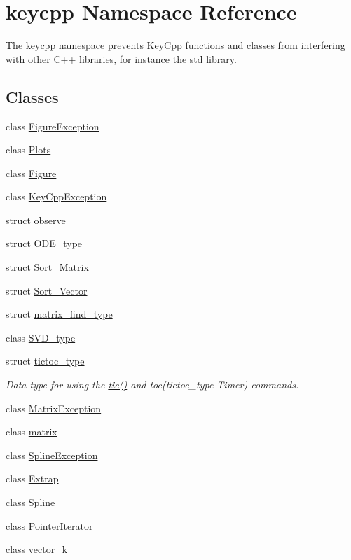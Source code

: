 \hypertarget{namespacekeycpp}{\section{keycpp Namespace Reference}
\label{namespacekeycpp}
}


The keycpp namespace prevents Key\-Cpp functions and classes from interfering with other C++ libraries, for instance the std library.  


\subsection*{Classes}
\begin{DoxyCompactItemize}
\item 
class \hyperlink{classkeycpp_1_1_figure_exception}{Figure\-Exception}
\item 
class \hyperlink{classkeycpp_1_1_plots}{Plots}
\item 
class \hyperlink{classkeycpp_1_1_figure}{Figure}
\item 
class \hyperlink{classkeycpp_1_1_key_cpp_exception}{Key\-Cpp\-Exception}
\item 
struct \hyperlink{structkeycpp_1_1observe}{observe}
\item 
struct \hyperlink{structkeycpp_1_1_o_d_e__type}{O\-D\-E\-\_\-type}
\item 
struct \hyperlink{structkeycpp_1_1_sort___matrix}{Sort\-\_\-\-Matrix}
\item 
struct \hyperlink{structkeycpp_1_1_sort___vector}{Sort\-\_\-\-Vector}
\item 
struct \hyperlink{structkeycpp_1_1matrix__find__type}{matrix\-\_\-find\-\_\-type}
\item 
class \hyperlink{classkeycpp_1_1_s_v_d__type}{S\-V\-D\-\_\-type}
\item 
struct \hyperlink{structkeycpp_1_1tictoc__type}{tictoc\-\_\-type}
\begin{DoxyCompactList}\small\item\em Data type for using the \hyperlink{namespacekeycpp_a6069a9eec0edfa1d401230013d98765e}{tic()} and toc(tictoc\-\_\-type Timer) commands. \end{DoxyCompactList}\item 
class \hyperlink{classkeycpp_1_1_matrix_exception}{Matrix\-Exception}
\item 
class \hyperlink{classkeycpp_1_1matrix}{matrix}
\item 
class \hyperlink{classkeycpp_1_1_spline_exception}{Spline\-Exception}
\item 
class \hyperlink{classkeycpp_1_1_extrap}{Extrap}
\item 
class \hyperlink{classkeycpp_1_1_spline}{Spline}
\item 
class \hyperlink{classkeycpp_1_1_pointer_iterator}{Pointer\-Iterator}
\item 
class \hyperlink{classkeycpp_1_1vector__k}{vector\-\_\-k}
\end{DoxyCompactItemize}
